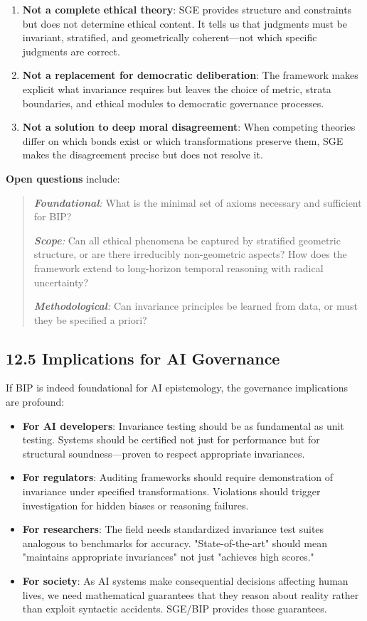 \documentclass[12pt]{article}
\theoremstyle{plain}
\theoremstyle{definition}
\theoremstyle{remark}
\begin{document}
\begin{enumerate}
\item
  \textbf{Not a complete ethical theory}: SGE provides structure and
  constraints but does not determine ethical content. It tells us that
  judgments must be invariant, stratified, and geometrically
  coherent---not which specific judgments are correct.
\item
  \textbf{Not a replacement for democratic deliberation}: The framework
  makes explicit what invariance requires but leaves the choice of
  metric, strata boundaries, and ethical modules to democratic
  governance processes.
\item
  \textbf{Not a solution to deep moral disagreement}: When competing
  theories differ on which bonds exist or which transformations preserve
  them, SGE makes the disagreement precise but does not resolve it.
\end{enumerate}

\textbf{Open questions} include:

\begin{quote}
\emph{\textbf{Foundational}:} What is the minimal set of axioms
necessary and sufficient for BIP?

\emph{\textbf{Scope}:} Can all ethical phenomena be captured by
stratified geometric structure, or are there irreducibly non-geometric
aspects? How does the framework extend to long-horizon temporal
reasoning with radical uncertainty?

\emph{\textbf{Methodological}:} Can invariance principles be learned
from data, or must they be specified a priori?
\end{quote}

\subsection{12.5 Implications for AI
Governance}\label{implications-for-ai-governance}

If BIP is indeed foundational for AI epistemology, the governance
implications are profound:

\begin{itemize}
\item
  \textbf{For AI developers}: Invariance testing should be as
  fundamental as unit testing. Systems should be certified not just for
  performance but for structural soundness---proven to respect
  appropriate invariances.
\item
  \textbf{For regulators}: Auditing frameworks should require
  demonstration of invariance under specified transformations.
  Violations should trigger investigation for hidden biases or reasoning
  failures.
\item
  \textbf{For researchers}: The field needs standardized invariance test
  suites analogous to benchmarks for accuracy. "State-of-the-art" should
  mean "maintains appropriate invariances" not just "achieves high
  scores."
\item
  \textbf{For society}: As AI systems make consequential decisions
  affecting human lives, we need mathematical guarantees that they
  reason about reality rather than exploit syntactic accidents. SGE/BIP
  provides those guarantees.
\end{itemize}
\end{document}
